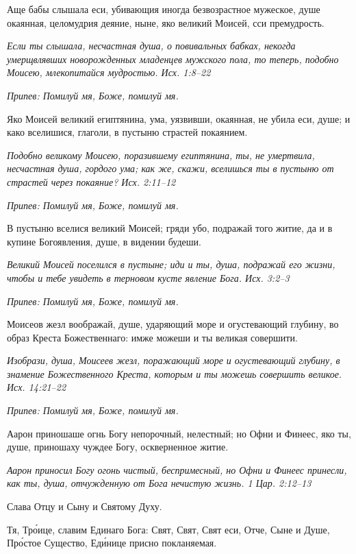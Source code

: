 Аще бабы слышала еси, убивающия иногда безвозрастное мужеское, душе окаянная, целомудрия деяние, ныне, яко великий Моисей, сси премудрость.


\itshape Если ты слышала, несчастная душа, о повивальных бабках, некогда умерщвлявших новорожденных младенцев мужского пола, то теперь, подобно Моисею, млекопитайся мудростью. Исх. 1:8–22\normalfont{}


\itshape Припев:\normalfont{} Помилуй мя, Боже, помилуй мя.


Яко Моисей великий египтянина, ума, уязвивши, окаянная, не убила еси, душе; и како вселишися, глаголи, в пустыню страстей покаянием.


\itshape Подобно великому Моисею, поразившему египтянина, ты, не умертвила, несчастная душа, гордого ума; как же, скажи, вселишься ты в пустыню от страстей через покаяние? Исх. 2:11–12\normalfont{}


\itshape Припев:\normalfont{} Помилуй мя, Боже, помилуй мя.


В пустыню вселися великий Моисей; гряди убо, подражай того житие, да и в купине Богоявления, душе, в видении будеши.


\itshape Великий Моисей поселился в пустыне; иди и ты, душа, подражай его жизни, чтобы и тебе увидеть в терновом кусте явление Бога. Исх. 3:2–3\normalfont{}


\itshape Припев:\normalfont{} Помилуй мя, Боже, помилуй мя.


Моисеов жезл воображай, душе, ударяющий море и огустевающий глубину, во образ Креста Божественнаго: имже можеши и ты великая совершити.


\itshape Изобрази, душа, Моисеев жезл, поражающий море и огустевающий глубину, в знамение Божественного Креста, которым и ты можешь совершить великое. Исх. 14:21–22\normalfont{}


\itshape Припев:\normalfont{} Помилуй мя, Боже, помилуй мя.


Аарон приношаше огнь Богу непорочный, нелестный; но Офни и Финеес, яко ты, душе, приношаху чуждее Богу, оскверненное житие.


\itshape Аарон приносил Богу огонь чистый, беспримесный, но Офни и Финеес принесли, как ты, душа, отчужденную от Бога нечистую жизнь. 1 Цар. 2:12–13\normalfont{}


Слава Отцу и Сыну и Святому Духу.


Тя, Тро́ице, славим Единаго Бога: Свят, Свят, Свят еси, Отче, Сыне и Душе, Про́стое Существо, Еди́нице присно покланяемая.


